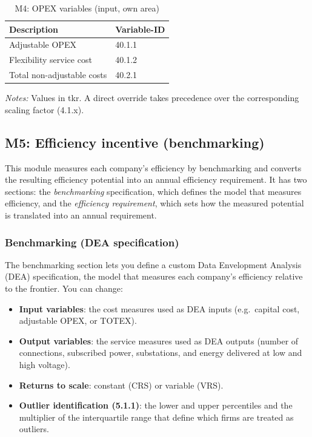 \begin{table}[H]
\centering
\begin{singlespace}
\footnotesize
\begin{threeparttable}
\caption{M4: OPEX variables (input, own area)}
\label{tab:app-var-m4}
\begin{tabular}{@{}p{10cm}l@{}}
\toprule
\textbf{Description} & \textbf{Variable-ID} \\
\midrule
Adjustable OPEX & 40.1.1 \\
Flexibility service cost & 40.1.2 \\
Total non-adjustable costs & 40.2.1 \\
\bottomrule
\end{tabular}
\begin{tablenotes}
\item \textit{Notes:} Values in tkr. A direct override takes precedence over the corresponding scaling factor (4.1.x).
\end{tablenotes}
\end{threeparttable}
\end{singlespace}
\end{table}

\subsection{M5: Efficiency incentive (benchmarking)}
\label{sec:spec-m5}

This module measures each company's efficiency by benchmarking and converts the resulting efficiency potential into an annual efficiency requirement. It has two sections: the \emph{benchmarking} specification, which defines the model that measures efficiency, and the \emph{efficiency requirement}, which sets how the measured potential is translated into an annual requirement.

\subsubsection{Benchmarking (DEA specification)}
\label{sec:spec-m5-benchmarking}

The benchmarking section lets you define a custom Data Envelopment Analysis (DEA) specification, the model that measures each company's efficiency relative to the frontier. You can change:

\begin{itemize}
  \item \textbf{Input variables}: the cost measures used as DEA inputs (e.g.\ capital cost, adjustable OPEX, or TOTEX).
  \item \textbf{Output variables}: the service measures used as DEA outputs (number of connections, subscribed power, substations, and energy delivered at low and high voltage).
  \item \textbf{Returns to scale}: constant (CRS) or variable (VRS).
  \item \textbf{Outlier identification (5.1.1)}: the lower and upper percentiles and the multiplier of the interquartile range that define which firms are treated as outliers.
\end{itemize}

